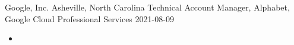 \roleheader
    {Google, Inc.}
    {Asheville, North Carolina}
    {Technical Account Manager, Alphabet, Google Cloud Professional Services}
    {2021-08-09}
    {}

\begin{itemize}

    \item

\end{itemize}
